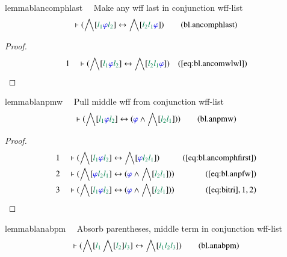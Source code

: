 \begin{restatable}{lemma}{blancomphlast}~~ Make any wff last in conjunction
wff-list
\begin{align}
\vdash ( \bigwedge[ \mwl{l_1} \mw{\varphi} \mwl{l_2} ] \leftrightarrow
    \bigwedge[ \mwl{l_2} \mwl{l_1} \mw{\varphi} ]
    )\label{eq:bl.ancomphlast}\tag{bl.ancomphlast}
\end{align}
\end{restatable}

\begin{proof}
\begin{align}
  1 &&  & \vdash ( \bigwedge[ \mwl{l_1} \mw{\varphi} \mwl{l_2} ]
      \leftrightarrow \bigwedge[ \mwl{l_2} \mwl{l_1}
      \mw{\varphi} ] )&(\mbox{\ref{eq:bl.ancomwlwl}})\notag
\end{align}
\end{proof}

\begin{restatable}{lemma}{blanpmw}~~ Pull middle wff from conjunction wff-list
\begin{align}
\vdash ( \bigwedge[ \mwl{l_1} \mw{\varphi} \mwl{l_2} ] \leftrightarrow (
    \mw{\varphi} \wedge \bigwedge[ \mwl{l_2} \mwl{l_1} ] )
    )\label{eq:bl.anpmw}\tag{bl.anpmw}
\end{align}
\end{restatable}

\begin{proof}
\begin{align}
  1 &&  & \vdash ( \bigwedge[ \mwl{l_1} \mw{\varphi} \mwl{l_2} ]
      \leftrightarrow \bigwedge[ \mw{\varphi} \mwl{l_2}
      \mwl{l_1} ] )&(\mbox{\ref{eq:bl.ancomphfirst}})\notag
  \\ 2 &&  & \vdash ( \bigwedge[ \mw{\varphi} \mwl{l_2} \mwl{l_1} ]
      \leftrightarrow ( \mw{\varphi} \wedge \bigwedge[
      \mwl{l_2} \mwl{l_1} ] )
      )&(\mbox{\ref{eq:bl.anpfw}})\notag
  \\ 3 &&  & \vdash ( \bigwedge[ \mwl{l_1} \mw{\varphi} \mwl{l_2} ]
      \leftrightarrow ( \mw{\varphi} \wedge \bigwedge[
      \mwl{l_2} \mwl{l_1} ] )
      )&(\mbox{\ref{eq:bitri}},1,2)\notag
\end{align}
\end{proof}

\begin{restatable}{lemma}{blanabpm}~~ Absorb parentheses, middle term in
conjunction wff-list
\begin{align}
\vdash ( \bigwedge[ \mwl{l_1} \bigwedge[ \mwl{l_2} ] \mwl{l_3} ]
    \leftrightarrow \bigwedge[ \mwl{l_1} \mwl{l_2} \mwl{l_3} ]
    )\label{eq:bl.anabpm}\tag{bl.anabpm}
\end{align}
\end{restatable}

